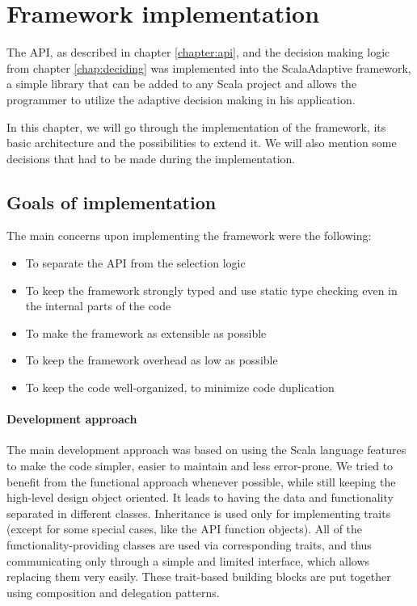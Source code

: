 \chapter{Framework implementation}
\label{chap:implementation}

The API, as described in chapter \ref{chapter:api}, and the decision making logic from chapter \ref{chap:deciding} was implemented into the ScalaAdaptive framework, a simple library that can be added to any Scala project and allows the programmer to utilize the adaptive decision making in his application.

In this chapter, we will go through the implementation of the framework, its basic architecture and the possibilities to extend it. We will also mention some decisions that had to be made during the implementation.

\section{Goals of implementation}

The main concerns upon implementing the framework were the following:

\begin{itemize}
	\item To separate the API from the selection logic
	\item To keep the framework strongly typed and use static type checking even in the internal parts of the code
	\item To make the framework as extensible as possible
	\item To keep the framework overhead as low as possible
	\item To keep the code well-organized, to minimize code duplication
\end{itemize}

\subsubsection{Development approach}

The main development approach was based on using the Scala language features to make the code simpler, easier to maintain and less error-prone. We tried to benefit from the functional approach whenever possible, while still keeping the high-level design object oriented. It leads to having the data and functionality separated in different classes. Inheritance is used only for implementing traits (except for some special cases, like the API function objects). All of the functionality-providing classes are used via corresponding traits, and thus communicating only through a simple and limited interface, which allows replacing them very easily. These trait-based building blocks are put together using composition and delegation patterns.

